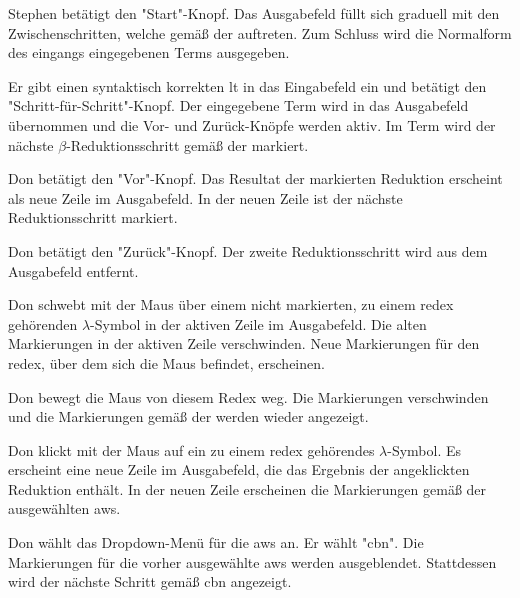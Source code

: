 \documentclass[parskip=full,11pt,twoside]{scrartcl}
\begin{document}
{Stephen betätigt den "Start"-Knopf.}
{Das Ausgabefeld füllt sich graduell mit den Zwischenschritten, welche gemäß der  auftreten.
Zum Schluss wird die Normalform des eingangs eingegebenen Terms ausgegeben.}


{Er gibt einen syntaktisch korrekten \gls{lt} in das Eingabefeld ein und betätigt
den "Schritt-für-Schritt"-Knopf.}
{Der eingegebene Term wird in das Ausgabefeld übernommen und die Vor- und
Zurück-Knöpfe werden aktiv. Im Term wird der nächste $\beta$-Reduktionsschritt
gemäß der  markiert.}

{Don betätigt den "Vor"-Knopf.}
{Das Resultat der markierten Reduktion erscheint als neue Zeile im Ausgabefeld.
In der neuen Zeile ist der nächste Reduktionsschritt markiert.}

{Don betätigt den "Zurück"-Knopf.}
{Der zweite Reduktionsschritt wird aus dem Ausgabefeld entfernt.}

{Don schwebt mit der Maus über einem nicht markierten, zu einem \gls{redex} gehörenden
$\lambda$-Symbol in der aktiven Zeile im Ausgabefeld.}
{Die alten Markierungen in der aktiven Zeile verschwinden. Neue Markierungen für den \gls{redex}, über dem
sich die Maus befindet, erscheinen.}

{Don bewegt die Maus von diesem Redex weg.}
{Die Markierungen verschwinden und die Markierungen gemäß der 
werden wieder angezeigt.}

{Don klickt mit der Maus auf ein zu einem \gls{redex} gehörendes $\lambda$-Symbol.}
{Es erscheint eine neue Zeile im Ausgabefeld, die das Ergebnis der angeklickten
Reduktion enthält. In der neuen Zeile erscheinen die Markierungen gemäß der ausgewählten
\gls{aws}.}

{Don wählt das Dropdown-Menü für die \gls{aws} an. Er wählt "\gls{cbn}".}
{Die Markierungen für die vorher ausgewählte \gls{aws} werden ausgeblendet.
Stattdessen wird der nächste Schritt gemäß \gls{cbn} angezeigt.}
\end{document}
